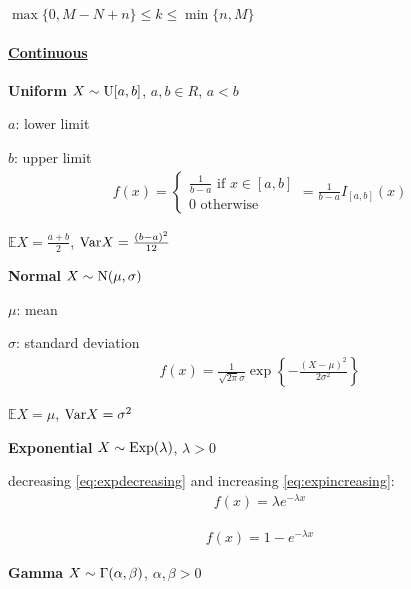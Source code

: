 $ \max\{ 0, M-N+n \} \leq  k \leq \min\{ n, M \} $

\vfill
\columnbreak

\paragraph{\underline{Continuous}} \hspace{0pt}

\vspace{10pt} \noindent \textbf{Uniform}
$X \sim \textrm{U}[a,b]$, $a,b \in R$, $a < b$

$a$: lower limit

$b$: upper limit
\begin{gather*}
f(x) = \begin{cases}
\frac{1}{b-a} \mbox{ if } x \in [a,b] \\
0 \mbox{ otherwise}
\end{cases} 
= \frac{1}{b-a} I_{[a,b]}(x)
\end{gather*}

$ \mathbb{E}X = \frac{a+b}{2}$, $\textrm{Var} X = \frac{(b-a)^2}{12} $

\vspace{10pt} \noindent \textbf{Normal}
$X \sim \textrm{N}(\mu, \sigma)$

$\mu$: mean

$\sigma$: standard deviation
\begin{gather*}
f(x) = \frac{1}{\sqrt{2\pi} \sigma} \exp{ \left\{ - \frac{(X-\mu)^2}{2 \sigma^2} \right\} }
\end{gather*}

$ \mathbb{E}X = \mu$, $\textrm{Var} X = \sigma^2$

\vspace{10pt} \noindent \textbf{Exponential}
$X \sim \textrm{Exp}(\lambda)$, $\lambda > 0$

decreasing \eqref{eq:expdecreasing} and increasing \eqref{eq:expincreasing}:
\begin{gather*}
f(x) = \lambda e^{-\lambda x}
\label{eq:expdecreasing} \tag{a}
\end{gather*}

\vspace{-30pt} \begin{gather*}
f(x) = 1 - e^{-\lambda x}
\label{eq:expincreasing} \tag{b}
\end{gather*}

\vspace{10pt} \noindent \textbf{Gamma}
$X \sim \Gamma(\alpha, \beta)$, $\alpha, \beta > 0$

